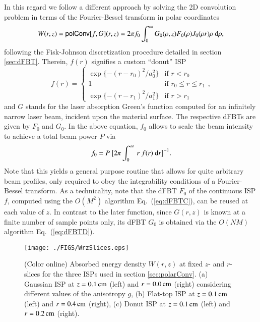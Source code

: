 \documentclass[review]{elsarticle}
\begin{document}
In this regard we follow a different approach by solving the 2D convolution
problem in terms of the Fourier-Bessel transform in polar coordinates
\cite{CONV:1997,Baddour:2009} 
\begin{equation}
W(r,z) = \mathsf{polConv}[f,G](r,z) = 2 \pi f_0 \int_0^\infty G_0(\rho,z) F_0(\rho) J_0(\rho r)\rho~{\rm d}\rho, \label{eq:polConvW}
\end{equation}
following the Fisk-Johnson discretization procedure detailed in section
\ref{sec:dFBT}. 
Therein, $f(r)$ signifies a custom ``donut'' ISP
\begin{equation}
f(r) = 
\begin{cases}
\exp\{-(r-r_0)^2/a_0^2\} & \text{if $r<r_0$}\\
1 & \text{if $r_0\le r \le r_1$}\\
\exp\{-(r-r_1)^2/a_1^2\} & \text{if $r>r_1$}
\end{cases},\label{eq:donut}
\end{equation}
and $G$ stands for the laser absorption Green's function computed for an 
infinitely narrow laser beam, incident upon the material surface.
The respective dFBTs are given by $F_0$ and $G_0$.
In the above equation, $f_0$ allows to scale the beam intensity to achieve 
a total beam power $P$ via
\begin{eqnarray}
f_0 = P~\big[2 \pi \int_0^\infty\, r~f(r)~{\rm d}r\big]^{-1}.
\end{eqnarray}
Note that this yields a general purpose routine that allows for quite arbitrary
beam profiles, only required to obey the integrability conditions of a
Fourier-Bessel transform.
As a technicality, note that the dFBT $F_0$ of
the continuous ISP $f$, computed using the $O(M^2)$ algorithm
Eq.~(\ref{eq:dFBTC}), can be reused at each value of $z$.  In contrast to
the later function, since $G(r,z)$ is known at a finite number of sample
points only, its dFBT $G_0$ is obtained via the $O(NM)$ algorithm
Eq.~(\ref{eq:dFBTD}).


%
%
\begin{figure}[t!]
\centerline{\texttt{[image: ./FIGS/WrzSlices.eps]} } 
\caption{(Color online) Absorbed energy density $W(r,z)$ at fixed $z$- and 
$r$-slices for the three ISPs used in section \ref{sec:polarConv}.
(a) Gaussian ISP at $z=0.1\,{\rm{cm}}$ (left) and 
$r=0.0\,{\rm{cm}}$ (right) considering different values of the anisotropy $g$,
(b) Flat-top ISP at $z=0.1\,{\rm{cm}}$ (left) and 
$r=0.4\,{\rm{cm}}$ (right),
(c) Donut ISP at $z=0.1\,{\rm{cm}}$ (left) and 
$r=0.2\,{\rm{cm}}$ (right).
}
\label{fig:WSlices}
\end{figure}
\end{document}
